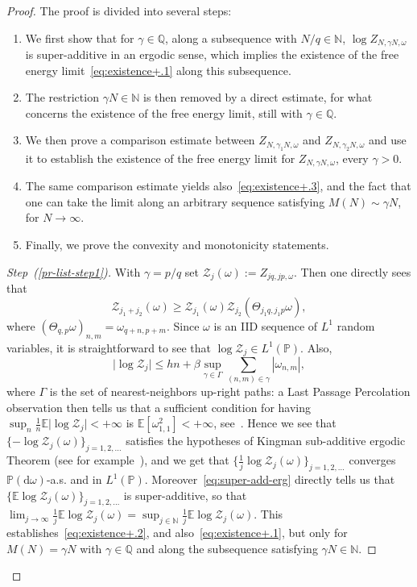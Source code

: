 \documentclass[11pt]{article}
\theoremstyle{definition}
\numberwithin{equation}{section}
\numberwithin{figure}{section}
\numberwithin{table}{section}
\newenvironment{step}[1]{\begin{proof}[#1]}{\let\qed\relax\end{proof}}
\newcommand{\gb}{\beta}
\newcommand{\go}{\omega}
\newcommand{\dd}{\mathrm{d}}
\newcommand{\cZ}{\ensuremath{\mathcal{Z}}}
\newcommand{\bbE}{\ensuremath{\mathbb{E}}}
\newcommand{\bbN}{\ensuremath{\mathbb{N}}}
\newcommand{\bbP}{\ensuremath{\mathbb{P}}}
\newcommand{\bbQ}{\ensuremath{\mathbb{Q}}}
\begin{document}
\begin{proof}
The proof is divided into several steps:
\begin{enumerate}
\item\label{pr-list-step1} We first show that for $\gamma \in \bbQ$, along a subsequence with $ N/q\in \bbN$, $\log Z_{N, \gamma N, \go}$ is super-additive in an ergodic sense, which implies the existence of the free energy limit~\eqref{eq:existence+.1} along this subsequence.
\item \label{pr-list-step2} The restriction $\gamma N\in \bbN$ is then removed by a direct estimate, for what concerns the existence of the free energy limit, still with $\gamma \in \bbQ$.
\item \label{pr-list-step3}We then prove a comparison estimate between $Z_{N, \gamma_1 N, \go}$ and $Z_{N, \gamma_2 N, \go}$ and use it to establish the existence of the free energy limit for $Z_{N, \gamma N, \go} $, every $\gamma>0$.
\item \label{pr-list-step4}The same comparison estimate yields also~\eqref{eq:existence+.3}, and the fact that one can take the limit along an arbitrary sequence satisfying $M (N) \sim \gamma N$, for $N \to \infty$.
\item \label{pr-list-step5}Finally, we prove the convexity and monotonicity statements.
\end{enumerate}
\goodbreak

\begin{step}{Step~(\ref{pr-list-step1})}
With $\gamma=p/q$ set $
\cZ_{j}(\go) := Z_{jq, jp, \go}$. Then one directly sees that
\begin{equation}\label{eq:super-add-erg}
\cZ_{j_1+j_2}(\go)\ge \cZ_{j_1}(\go) \cZ_{j_2}\left(\Theta_{j_1 q,j_1 p} \go\right),
\end{equation}
where $(\Theta_{q,p} \go)_{n,m}= \go_{q+n,p+m}$. Since $\go$ is an IID sequence of $L^1$ random variables, it is straightforward to see that $\log \cZ_{j} \in L^1(\bbP)$. Also,
\[
\lvert \log \cZ_{j} \vert \leq h n+ \gb \sup_{\gamma \in \Gamma } \sum_{(n,m)\in\gamma} |\go_{n,m}|,
\]
where $\Gamma$ is the set of nearest-neighbors up-right paths: a Last Passage Percolation observation then tells us that a sufficient condition for having $\sup_n \frac{1}{n} \bbE \lvert\log \cZ_{j} \vert <+\infty$ is $\bbE[\go_{1,1}^2]<+\infty$, see~\cite{cf:Martin02}. Hence we see that $\{ -\log \cZ_{j}(\go)\}_{j=1,2, \ldots}$ satisfies the hypotheses of Kingman sub-additive ergodic Theorem (see for example~\cite[Section~A.7]{cf:GB}), and we get that $\{\frac{1}{j}\log \cZ_{j}(\go)\}_{j=1,2,\ldots}$ converges $\bbP(\dd \go)$-a.s. and in $L^1(\bbP)$. Moreover~\eqref{eq:super-add-erg} directly tells us that $\{\bbE \log \cZ_{j}(\go)\}_{j=1,2, \ldots}$ is super-additive, so that $\lim _{j\to \infty} \frac{1}{j} \bbE \log \cZ_{j}(\go)= \sup_{j\in \bbN} \frac{1}{j} \bbE \log \cZ_{j}(\go)$. This establishes~\eqref{eq:existence+.2}, and also~\eqref{eq:existence+.1}, but only for $M(N)= \gamma N$ with $\gamma \in \bbQ$ and along the subsequence satisfying $\gamma N \in \bbN$.
\end{step}


\end{proof}
\end{document}
